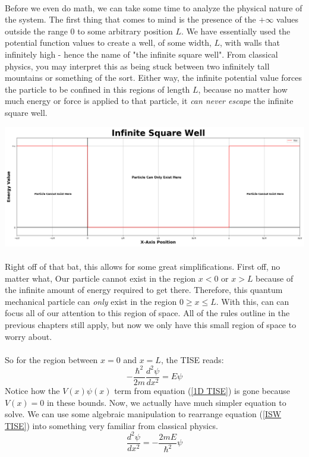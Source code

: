 \documentclass[12pt,letterpaper]{book}
\begin{document}
\paragraph*{}Before we even do math, we can take some time to analyze the physical nature of the system. The first thing that comes to mind is the presence of the $+\infty$ values outside the range $0$ to some arbitrary position $L$. We have essentially used the potential function values to create a well, of some width, $L$, with walls that infinitely high - hence the name of "the infinite square well". From classical physics, you may interpret this as being stuck between two infinitely tall mountains or something of the sort. Either way, the infinite potential value forces the particle to be confined in this regions of length $L$, because no matter how much energy or force is applied to that particle, it \textit{can never escape} the infinite square well.
\begin{center}
\includegraphics[scale=0.32]{ISW}
\end{center}
\paragraph*{}Right off of that bat, this allows for some great simplifications. First off, no matter what, Our particle cannot exist in the region $x < 0$ or $x > L$ because of the infinite amount of energy required to get there. Therefore, this quantum mechanical particle can \textit{only} exist in the region $0 \geq x \leq L$. With this, can can focus all of our attention to this region of space. All of the rules outline in the previous chapters still apply, but now we only have this small region of space to worry about.
\paragraph*{}So for the region between $x = 0$ and $x = L$, the TISE reads:
\begin{equation}
\label{ISW TISE}
-\frac{\hbar^2}{2m}\frac{d^2 \psi}{dx^2} = E\psi
\end{equation}
Notice how the $V(x)\psi(x)$ term from equation (\ref{1D TISE}) is gone because $V(x) = 0$ in these bounds. Now, we actually have much simpler equation to solve. We can use some algebraic manipulation to rearrange equation (\ref{ISW TISE}) into something very familiar from classical physics.
\begin{equation}
\label{HO ODE}
\frac{d^2 \psi}{dx^2} = -\frac{2mE}{\hbar^2}\psi
\end{equation}
\end{document}
